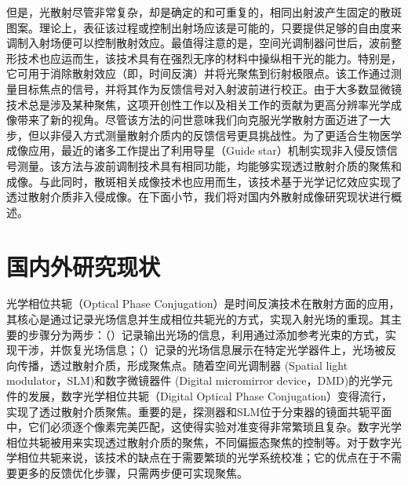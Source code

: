 但是，光散射尽管非常复杂，却是确定的和可重复的，相同出射波产生固定的散斑图案。理论上，表征该过程或控制出射场应该是可能的，只要提供足够的自由度来调制入射场便可以控制散射效应。最值得注意的是，空间光调制器问世后，波前整形技术也应运而生，该技术具有在强烈无序的材料中操纵相干光的能力。特别是，它可用于消除散射效应（即，时间反演）并将光聚焦到衍射极限点\cite{Vellekoop2007}。该工作\cite{Vellekoop2007}通过测量目标焦点的信号，并将其作为反馈信号对入射波前进行校正。由于大多数显微镜技术总是涉及某种聚焦，这项开创性工作以及相关工作的贡献为更高分辨率光学成像带来了新的视角。尽管该方法的问世意味我们向克服光学散射方面迈进了一大步，但以非侵入方式测量散射介质内的反馈信号更具挑战性。为了更适合生物医学成像应用，最近的诸多工作提出了利用导星（Guide star）机制实现非入侵反馈信号测量。该方法与波前调制技术具有相同功能，均能够实现透过散射介质的聚焦和成像。与此同时，散斑相关成像技术也应用而生，该技术基于光学记忆效应实现了透过散射介质非入侵成像。在下面小节，我们将对国内外散射成像研究现状进行概述。

\section{国内外研究现状}

光学相位共轭（Optical Phase Conjugation）是时间反演技术在散射方面的应用\cite{derode_robust_1995,draeger_one_channel_1997,leith_holographic_1966,fink_acoustic_2001}，其核心是通过记录光场信息并生成相位共轭光的方式，实现入射光场的重现。其主要的步骤分为两步：（）记录输出光场的信息，利用通过添加参考光束的方式，实现干涉，并恢复光场信息；（）记录的光场信息展示在特定光学器件上，光场被反向传播，透过散射介质，形成聚焦点。随着空间光调制器 (Spatial light modulator，SLM)和数字微镜器件 (Digital micromirror device，DMD)的光学元件的发展，数字光学相位共轭（Digital Optical Phase Conjugation）变得流行，实现了透过散射介质聚焦\cite{yaqoob_optical_2008,paurisse_phase_2009,cui_implementation_2010,lhermite_coherent_2010}。重要的是，探测器和SLM位于分束器的镜面共轭平面中，它们必须逐个像素完美匹配，这使得实验对准变得非常繁琐且复杂。数字光学相位共轭被用来实现透过散射介质的聚焦，不同偏振态聚焦的控制等。对于数字光学相位共轭来说，该技术的缺点在于需要繁琐的光学系统校准；它的优点在于不需要更多的反馈优化步骤，只需两步便可实现聚焦。

